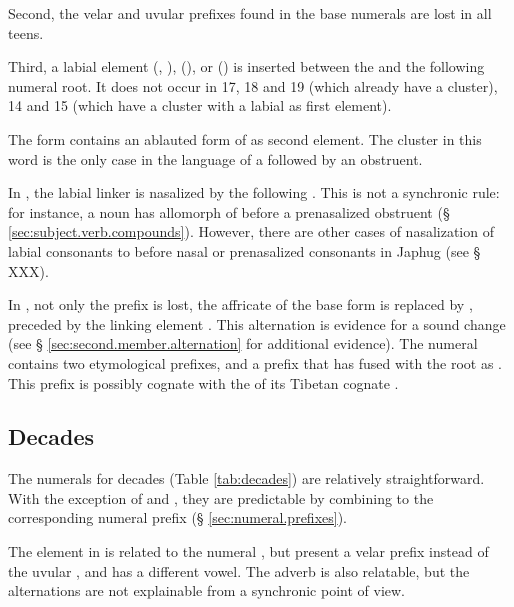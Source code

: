 Second, the velar  and uvular  prefixes found in the base numerals are lost in all teens.

Third, a labial element  (, ),  (), or  () is inserted between the  and the following numeral root. It does not occur in 17, 18 and 19 (which already have a cluster), 14 and 15 (which have a cluster with a labial as first element).

The form  contains an ablauted form of  as second element. The cluster  in this word is the only case in the language of a  followed by an obstruent. 

In , the labial linker is nasalized by the following . This is not a synchronic rule: for instance, a noun  has  allomorph of  before a prenasalized obstruent (§ \ref{sec:subject.verb.compounds}). However, there are other cases of nasalization of labial consonants to  before nasal or prenasalized consonants in Japhug (see § XXX).

In , not only the prefix  is lost, the  affricate of the base form 	 is replaced by , preceded by the linking element . This  \tld{}  alternation is evidence for a sound change  \fl{}  (see § \ref{sec:second.member.alternation} for additional evidence).  The numeral  contains two etymological prefixes,  and a prefix  that has fused with the root as . This  prefix is possibly cognate with the  of its Tibetan cognate   .


\subsection{Decades} \label{sec:decades}
The numerals for decades (Table \ref{tab:decades}) are relatively straightforward. With the exception of  and , they are predictable by combining  to the corresponding numeral prefix (§ \ref{sec:numeral.prefixes}).

The element  in  is related to the numeral  , but present a velar  prefix instead of the uvular , and has a different vowel. The adverb  is also relatable, but the alternations are not explainable from a synchronic point of view.


